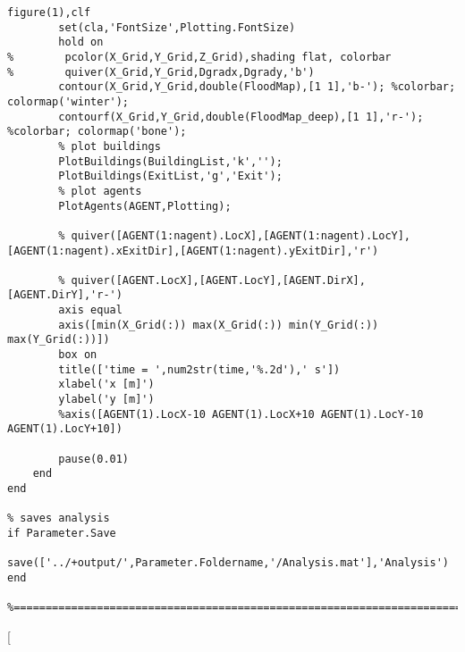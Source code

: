 \begin{lstlisting}[breaklines]
        figure(1),clf
        set(cla,'FontSize',Plotting.FontSize)
        hold on
%        pcolor(X_Grid,Y_Grid,Z_Grid),shading flat, colorbar
%        quiver(X_Grid,Y_Grid,Dgradx,Dgrady,'b')
        contour(X_Grid,Y_Grid,double(FloodMap),[1 1],'b-'); %colorbar; colormap('winter');
        contourf(X_Grid,Y_Grid,double(FloodMap_deep),[1 1],'r-'); %colorbar; colormap('bone');
        % plot buildings
        PlotBuildings(BuildingList,'k','');
        PlotBuildings(ExitList,'g','Exit');
        % plot agents
        PlotAgents(AGENT,Plotting);

        % quiver([AGENT(1:nagent).LocX],[AGENT(1:nagent).LocY],[AGENT(1:nagent).xExitDir],[AGENT(1:nagent).yExitDir],'r')

        % quiver([AGENT.LocX],[AGENT.LocY],[AGENT.DirX],[AGENT.DirY],'r-')
        axis equal
        axis([min(X_Grid(:)) max(X_Grid(:)) min(Y_Grid(:)) max(Y_Grid(:))])
        box on
        title(['time = ',num2str(time,'%.2d'),' s'])
        xlabel('x [m]')
        ylabel('y [m]')
        %axis([AGENT(1).LocX-10 AGENT(1).LocX+10 AGENT(1).LocY-10 AGENT(1).LocY+10])

        pause(0.01)
    end
end

% saves analysis
if Parameter.Save
    save(['../+output/',Parameter.Foldername,'/Analysis.mat'],'Analysis')
end

%==========================================================================
\end{lstlisting}[


    
